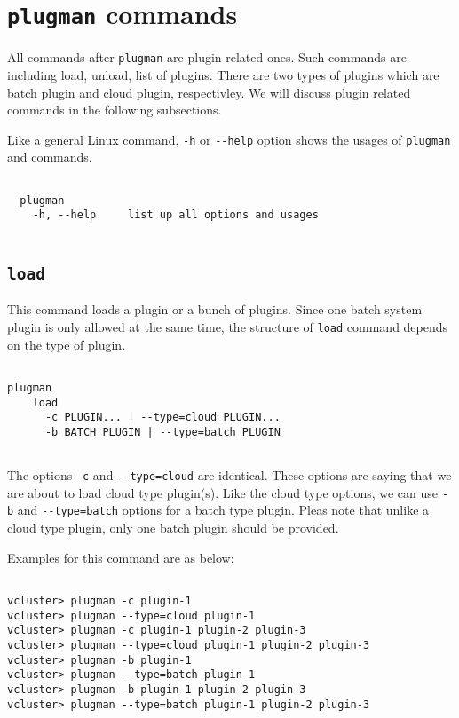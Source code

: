 \documentclass[11pt]{article}
\def \ttt{\texttt}
\def \vb{\verb}
\begin{document}
\section{\ttt{plugman} commands}

All commands after \vb+plugman+ are plugin related ones. Such commands are including load, unload, list of plugins. There are two types of plugins which are batch plugin and cloud plugin, respectivley. We will discuss plugin related commands in the following subsections.

Like a general Linux command, \vb+-h+ or \vb+--help+ option shows the usages of \vb+plugman+ and commands.

\begin{Verbatim}[fontfamily=courier, fontsize = \small, obeytabs
=true, tabsize=4, frame=lines]

  plugman 
    -h, --help     list up all options and usages
  
\end{Verbatim}


\subsection{\ttt{load}}
This command loads a plugin or a bunch of plugins. Since one batch system plugin is only allowed at the same time, the structure of \vb+load+ command depends on the type of plugin.  

\begin{Verbatim}[fontfamily=courier, fontsize = \small, obeytabs
=true, tabsize=4, frame=lines]

plugman 
    load
      -c PLUGIN... | --type=cloud PLUGIN... 
      -b BATCH_PLUGIN | --type=batch PLUGIN
      
\end{Verbatim}


The options \vb+-c+ and \vb+--type=cloud+ are identical. These options are saying that we are about to load cloud type plugin(s). Like the cloud type options, we can use \vb+-b+ and \vb+--type=batch+ options for a batch type plugin. Pleas note that unlike a cloud type plugin, only one batch plugin should be provided.

Examples for this command are as below:


\begin{Verbatim}[fontfamily=courier, fontsize = \small, obeytabs
=true, tabsize=4, frame=lines]

vcluster> plugman -c plugin-1
vcluster> plugman --type=cloud plugin-1
vcluster> plugman -c plugin-1 plugin-2 plugin-3
vcluster> plugman --type=cloud plugin-1 plugin-2 plugin-3
vcluster> plugman -b plugin-1
vcluster> plugman --type=batch plugin-1
vcluster> plugman -b plugin-1 plugin-2 plugin-3
vcluster> plugman --type=batch plugin-1 plugin-2 plugin-3

\end{Verbatim}
\end{document}
